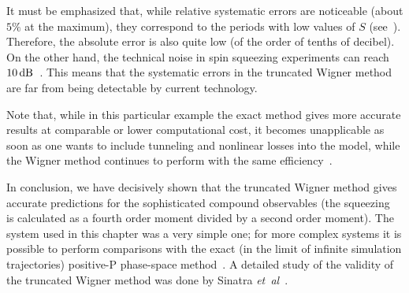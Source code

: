 It must be emphasized that, while relative systematic errors are noticeable (about $5\%$ at the maximum), they correspond to the periods with low values of $S$ (see~).
Therefore, the absolute error is also quite low (of the order of tenths of decibel).
On the other hand, the technical noise in spin squeezing experiments can reach $10\mbox{\ensuremath{\,\mathrm{dB}}}$~\cite{Riedel2010}.
This means that the systematic errors in the truncated Wigner method are far from being detectable by current technology.

Note that, while in this particular example the exact method gives more accurate results at comparable or lower computational cost, it becomes unapplicable as soon as one wants to include tunneling and nonlinear losses into the model, while the Wigner method continues to perform with the same efficiency~\cite{Opanchuk2012a}.

In conclusion, we have decisively shown that the truncated Wigner method gives accurate predictions for the sophisticated compound observables (the squeezing~ is calculated as a fourth order moment divided by a second order moment).
The system used in this chapter was a very simple one; for more complex systems it is possible to perform comparisons with the exact (in the limit of infinite simulation trajectories) positive-P phase-space method~\cite{Drummond1993,Chaturvedi2002,Dechoum2004}.
A detailed study of the validity of the truncated Wigner method was done by Sinatra \textit{et~al}~\cite{Sinatra2002}.

